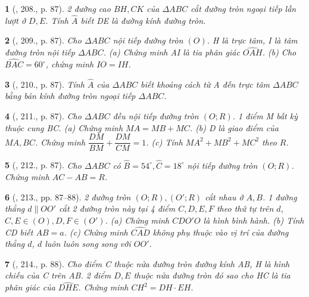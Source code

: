\documentclass{article}
\newtheorem{baitoan}{}
\begin{document}
\begin{baitoan}[\cite{Binh_Toan_9_tap_2}, 208., p. 87]
	2 đường cao $BH,CK$ của $\Delta ABC$ cắt đường tròn ngoại tiếp lần lượt ở $D,E$. Tính $\widehat{A}$ biết DE là đường kính đường tròn.
\end{baitoan}

\begin{baitoan}[\cite{Binh_Toan_9_tap_2}, 209., p. 87]
	Cho $\Delta ABC$ nội tiếp đường tròn $(O)$. H là trực tâm, I là tâm đường tròn nội tiếp $\Delta ABC$. (a) Chứng minh AI là tia phân giác $\widehat{OAH}$. (b) Cho $\widehat{BAC} = 60^\circ$, chứng minh $IO = IH$.
\end{baitoan}

\begin{baitoan}[\cite{Binh_Toan_9_tap_2}, 210., p. 87]
	Tính $\widehat{A}$ của $\Delta ABC$ biết khoảng cách từ A đến trực tâm $\Delta ABC$ bằng bán kính đường tròn ngoại tiếp $\Delta ABC$.
\end{baitoan}

\begin{baitoan}[\cite{Binh_Toan_9_tap_2}, 211., p. 87]
	Cho $\Delta ABC$ đều nội tiếp đường tròn $(O;R)$. 1 điểm M bất kỳ thuộc cung BC. (a) Chứng minh $MA = MB + MC$. (b) D là giao điểm của $MA,BC$. Chứng minh $\dfrac{DM}{BM}  + \dfrac{DM}{CM} = 1$. (c) Tính $MA^2 + MB^2 + MC^2$ theo $R$.
\end{baitoan}

\begin{baitoan}[\cite{Binh_Toan_9_tap_2}, 212., p. 87]
	Cho $\Delta ABC$ có $\widehat{B} = 54^\circ,\widehat{C} = 18^\circ$ nội tiếp đường tròn $(O;R)$. Chứng minh $AC - AB = R$.
\end{baitoan}

\begin{baitoan}[\cite{Binh_Toan_9_tap_2}, 213., pp. 87--88]
	2 đường tròn $(O;R),(O';R)$ cắt nhau ở $A,B$. 1 đường thẳng $d\parallel OO'$ cắt 2 đường tròn này tại 4 điểm $C,D,E,F$ theo thứ tự trên $d$, $C,E\in(O),D,F\in(O')$. (a) Chứng minh $CDO'O$ là hình bình hành. (b) Tính CD biết $AB = a$. (c) Chứng minh $\widehat{CAD}$ không phụ thuộc vào vị trí của đường thẳng $d$, $d$ luôn luôn song song với $OO'$.
\end{baitoan}

\begin{baitoan}[\cite{Binh_Toan_9_tap_2}, 214., p. 88]
	Cho điểm C thuộc nửa đường tròn đường kính AB, H là hình chiếu của C trên AB. 2 điểm $D,E$ thuộc nửa đường tròn đó sao cho HC là tia phân giác của $\widehat{DHE}$. Chứng minh $CH^2 = DH\cdot EH$.
\end{baitoan}
\end{document}
